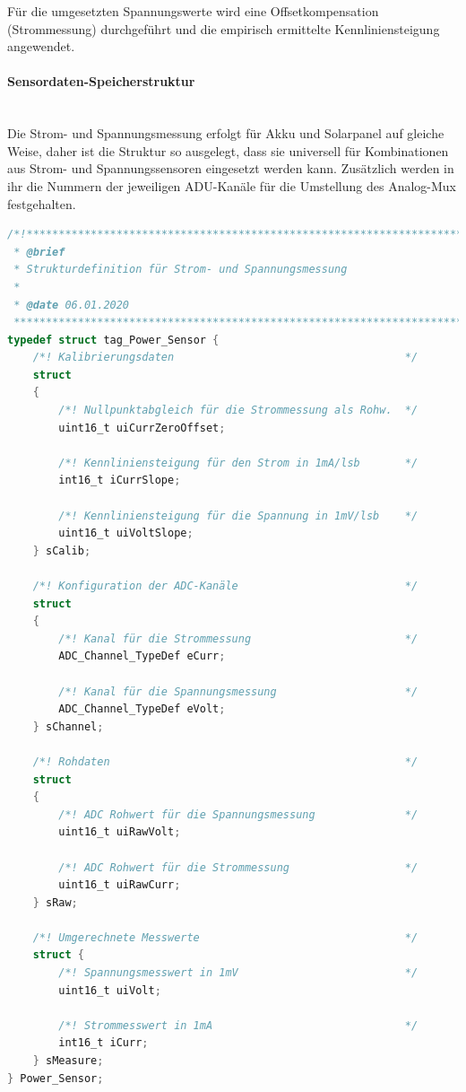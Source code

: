             Für die umgesetzten Spannungswerte wird eine Offsetkompensation (Strommessung) durchgeführt und die empirisch ermittelte Kennliniensteigung angewendet.
            
            \paragraph{Sensordaten-Speicherstruktur}\mbox{}\\
            Die Strom- und Spannungsmessung erfolgt für Akku und Solarpanel auf gleiche Weise, daher ist die Struktur so ausgelegt, dass sie universell für Kombinationen aus Strom- und Spannungssensoren eingesetzt werden kann. Zusätzlich werden in ihr die Nummern der jeweiligen ADU-Kanäle für die Umstellung des Analog-Mux festgehalten.
            
            \begin{lstlisting}[language=C,caption={Typdefinition für die Sensordatenstruktur der Strom- und Spannungssensoren},label=lst:power_typedef]
/*!****************************************************************************
 * @brief
 * Strukturdefinition für Strom- und Spannungsmessung
 *
 * @date 06.01.2020
 ******************************************************************************/
typedef struct tag_Power_Sensor {
    /*! Kalibrierungsdaten                                    */
    struct
    {
        /*! Nullpunktabgleich für die Strommessung als Rohw.  */
        uint16_t uiCurrZeroOffset;
        
        /*! Kennliniensteigung für den Strom in 1mA/lsb       */
        int16_t iCurrSlope;
        
        /*! Kennliniensteigung für die Spannung in 1mV/lsb    */
        uint16_t uiVoltSlope;
    } sCalib;
    
    /*! Konfiguration der ADC-Kanäle                          */
    struct
    {
        /*! Kanal für die Strommessung                        */
        ADC_Channel_TypeDef eCurr;
        
        /*! Kanal für die Spannungsmessung                    */
        ADC_Channel_TypeDef eVolt;
    } sChannel;
    
    /*! Rohdaten                                              */
    struct 
    {
        /*! ADC Rohwert für die Spannungsmessung              */
        uint16_t uiRawVolt;
        
        /*! ADC Rohwert für die Strommessung                  */
        uint16_t uiRawCurr;
    } sRaw;
    
    /*! Umgerechnete Messwerte                                */
    struct {
        /*! Spannungsmesswert in 1mV                          */
        uint16_t uiVolt;
        
        /*! Strommesswert in 1mA                              */
        int16_t iCurr;
    } sMeasure;
} Power_Sensor;
    \end{lstlisting}
            
